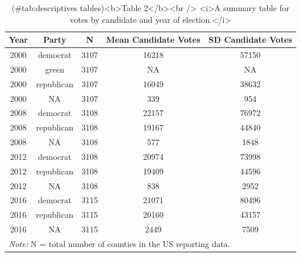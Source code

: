 \documentclass[
  english,
  man]{apa6}
\begin{document}
\begin{table}

\caption{(\#tab:descriptives tables)<b>Table 2</b><br /> <i>A summary table for votes by candidate and year of election.</i>}
\centering
\begin{tabular}[t]{c|c|c|c|c}
\hline
Year & Party & N & Mean Candidate Votes & SD Candidate Votes\\
\hline
2000 & democrat & 3107 & 16218 & 57150\\
\hline
2000 & green & 3107 & NA & NA\\
\hline
2000 & republican & 3107 & 16049 & 38632\\
\hline
2000 & NA & 3107 & 339 & 954\\
\hline
2008 & democrat & 3108 & 22157 & 76972\\
\hline
2008 & republican & 3108 & 19167 & 44840\\
\hline
2008 & NA & 3108 & 577 & 1848\\
\hline
2012 & democrat & 3108 & 20974 & 73998\\
\hline
2012 & republican & 3108 & 19409 & 44596\\
\hline
2012 & NA & 3108 & 838 & 2952\\
\hline
2016 & democrat & 3115 & 21071 & 80496\\
\hline
2016 & republican & 3115 & 20160 & 43157\\
\hline
2016 & NA & 3115 & 2449 & 7509\\
\hline
\multicolumn{5}{l}{\rule{0pt}{1em}\textit{Note: } N = total number of counties in the US reporting data.}\\
\end{tabular}
\end{table}
\end{document}
